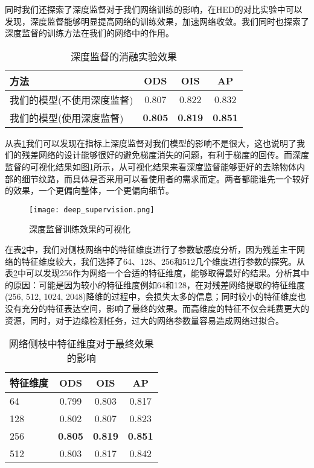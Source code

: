 \documentclass[master]{thesis-uestc}
\begin{document}
{同时我们还探索了深度监督对于我们网络训练的影响，在HED的对比实验中可以发现，深度监督能够明显提高网络的训练效果，加速网络收敛。我们同时也探索了深度监督的训练方法在我们的网络中的作用。
\begin{table}[h!]
    \begin{center}
        \caption{深度监督的消融实验效果}
        \label{tab:deep_supervision}
        \begin{tabular}{l|c|c|c}
            \toprule %
            \textbf{方法} & \textbf{ODS} & \textbf{OIS} & \textbf{AP}\\
            \midrule %
            我们的模型(不使用深度监督) & 0.807&0.822&0.832\\   
            我们的模型(使用深度监督) & \textbf{0.805} &\textbf{0.819} & \textbf{0.851}\\
            \bottomrule %
        \end{tabular}
    \end{center}
\end{table}
从表\ref{tab:deep_supervision}我们可以发现在指标上深度监督对我们模型的影响不是很大，这也说明了我们的残差网络的设计能够很好的避免梯度消失的问题，有利于梯度的回传。而深度监督的可视化结果如图\ref{deep_supervision}所示，从可视化结果来看深度监督能够更好的去除物体内部的细节纹路，而具体是否采用可以看使用者的需求而定。两者都能谁先一个较好的效果，一个更偏向整体，一个更偏向细节。
\begin{figure}[h!]
    \texttt{[image: deep\_supervision.png]}
    \caption{深度监督训练效果的可视化}
    \label{deep_supervision}
\end{figure}


在表\ref{tab:feature-channel}中，我们对侧枝网络中的特征维度进行了参数敏感度分析，因为残差主干网络的特征维度较大，我们选择了64、128、256和512几个维度进行参数的探究。从表\ref{tab:feature-channel}中可以发现256作为网络一个合适的特征维度，能够取得最好的结果。分析其中的原因：可能是因为较小的特征维度例如64和128，在对残差网络提取的特征维度(256, 512, 1024, 2048)降维的过程中，会损失太多的信息；同时较小的特征维度也没有充分的特征表达空间，影响了最终的效果。而高维度的特征不仅会耗费更大的资源，同时，对于边缘检测任务，过大的网络参数量容易造成网络过拟合。
\begin{table}[h!]
    \begin{center}
        \caption{网络侧枝中特征维度对于最终效果的影响}
        \label{tab:feature-channel}
        \begin{tabular}{l|c|c|c}
            \toprule %
            \textbf{特征维度} & \textbf{ODS} & \textbf{OIS} & \textbf{AP}\\
            \midrule %
            64 & 0.799&0.803&0.817\\   
            128 & 0.802 &0.807 & 0.823\\
            256 &\textbf{0.805}&\textbf{0.819}&\textbf{0.851}\\  
            512 & 0.803&0.817&0.842\\    
            \bottomrule %
        \end{tabular}
    \end{center}
\end{table}

}
\end{document}
